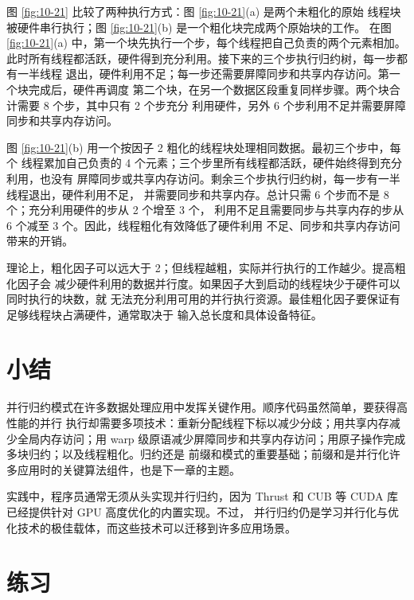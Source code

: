 图 \ref{fig:10-21} 比较了两种执行方式：图 \ref{fig:10-21}(a) 是两个未粗化的原始
线程块被硬件串行执行；图 \ref{fig:10-21}(b) 是一个粗化块完成两个原始块的工作。
在图 \ref{fig:10-21}(a) 中，第一个块先执行一个步，每个线程把自己负责的两个元素相加。
此时所有线程都活跃，硬件得到充分利用。接下来的三个步执行归约树，每一步都有一半线程
退出，硬件利用不足；每一步还需要屏障同步和共享内存访问。第一个块完成后，硬件再调度
第二个块，在另一个数据区段重复同样步骤。两个块合计需要 8 个步，其中只有 2 个步充分
利用硬件，另外 6 个步利用不足并需要屏障同步和共享内存访问。

图 \ref{fig:10-21}(b) 用一个按因子 2 粗化的线程块处理相同数据。最初三个步中，每个
线程累加自己负责的 4 个元素；三个步里所有线程都活跃，硬件始终得到充分利用，也没有
屏障同步或共享内存访问。剩余三个步执行归约树，每一步有一半线程退出，硬件利用不足，
并需要同步和共享内存。总计只需 6 个步而不是 8 个；充分利用硬件的步从 2 个增至 3 个，
利用不足且需要同步与共享内存的步从 6 个减至 3 个。因此，线程粗化有效降低了硬件利用
不足、同步和共享内存访问带来的开销。

理论上，粗化因子可以远大于 2；但线程越粗，实际并行执行的工作越少。提高粗化因子会
减少硬件利用的数据并行度。如果因子大到启动的线程块少于硬件可以同时执行的块数，就
无法充分利用可用的并行执行资源。最佳粗化因子要保证有足够线程块占满硬件，通常取决于
输入总长度和具体设备特征。

\section{小结}
\label{sec:reduction-summary}

并行归约模式在许多数据处理应用中发挥关键作用。顺序代码虽然简单，要获得高性能的并行
执行却需要多项技术：重新分配线程下标以减少分歧；用共享内存减少全局内存访问；用 warp
级原语减少屏障同步和共享内存访问；用原子操作完成多块归约；以及线程粗化。归约还是
前缀和模式的重要基础；前缀和是并行化许多应用时的关键算法组件，也是下一章的主题。

实践中，程序员通常无须从头实现并行归约，因为 Thrust\cite{bell2012thrust,nvidia-thrust2025}
和 CUB\cite{nvidia-cub2025} 等 CUDA 库已经提供针对 GPU 高度优化的内置实现。不过，
并行归约仍是学习并行化与优化技术的极佳载体，而这些技术可以迁移到许多应用场景。

\section*{练习}

